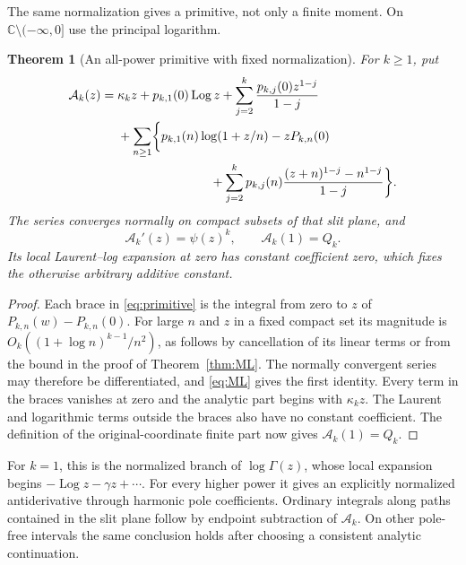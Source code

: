 \documentclass[11pt,a4paper]{article}
\numberwithin{equation}{section}
\newtheorem{theorem}{Theorem}[section]
\theoremstyle{definition}
\theoremstyle{remark}
\newcommand{\C}{\mathbb C}
\newcommand{\Log}{\operatorname{Log}}
\begin{document}
The same normalization gives a primitive, not only a finite moment.
On $\C\setminus(-\infty,0]$ use the principal logarithm.

\begin{theorem}[An all-power primitive with fixed normalization]
\label{thm:primitive}
For $k\ge1$, put
\begin{align}
 \mathcal A_k(z)={}&\kappa_k z+p_{k,1}(0)\Log z
             +\sum_{j=2}^k\frac{p_{k,j}(0)z^{1-j}}{1-j}
 \notag\\
 &+\sum_{n\ge1}\biggl\{
       p_{k,1}(n)\log(1+z/n)-zP_{k,n}(0)
 \notag\\
 &\hspace{26mm}
       +\sum_{j=2}^k p_{k,j}(n)
             \frac{(z+n)^{1-j}-n^{1-j}}{1-j}\biggr\}.
 \label{eq:primitive}
\end{align}
The series converges normally on compact subsets of that slit plane,
and
\begin{equation}
             \mathcal A_k'(z)=\psi(z)^k,\qquad
             \mathcal A_k(1)=Q_k.
 \label{eq:primitive-properties}
\end{equation}
Its local Laurent--log expansion at zero has constant coefficient
zero, which fixes the otherwise arbitrary additive constant.
\end{theorem}

\begin{proof}
Each brace in \eqref{eq:primitive} is the integral from zero to $z$
of $P_{k,n}(w)-P_{k,n}(0)$.  For large $n$ and $z$ in a fixed
compact set its magnitude is
$O_k((1+\log n)^{k-1}/n^2)$, as follows by cancellation of its
linear terms or from the bound in the proof of Theorem~\ref{thm:ML}.
The normally convergent series may therefore be differentiated, and
\eqref{eq:ML} gives the first identity.  Every term in the braces
vanishes at zero and the analytic part begins with $\kappa_kz$.
The Laurent and logarithmic terms outside the braces also have no
constant coefficient.  The definition of the original-coordinate
finite part now gives $\mathcal A_k(1)=Q_k$.
\end{proof}

For $k=1$, this is the normalized branch of $\log\Gamma(z)$,
whose local expansion begins $-\Log z-\gamma z+\cdots$.
For every higher power it gives an explicitly normalized antiderivative
through harmonic pole coefficients.  Ordinary integrals along paths
contained in the slit plane follow by endpoint subtraction of
$\mathcal A_k$.  On other pole-free intervals the same conclusion
holds after choosing a consistent analytic continuation.
\end{document}
